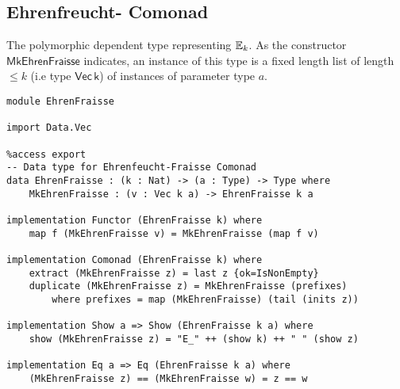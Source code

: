 \subsection{Ehrenfreucht-{\Fraisse} Comonad}
The polymorphic dependent type representing ${\mathbb{E}_{k}}$. As the constructor $\mathsf{MkEhrenFraisse}$ indicates, an instance of this type is a fixed length list of length $\leq k$ (i.e type $\mathsf{Vec} \, \mathsf{k}$) of instances of parameter type $a$.  
\begin{verbatim}
module EhrenFraisse

import Data.Vec 

%access export
-- Data type for Ehrenfeucht-Fraisse Comonad
data EhrenFraisse : (k : Nat) -> (a : Type) -> Type where
    MkEhrenFraisse : (v : Vec k a) -> EhrenFraisse k a

implementation Functor (EhrenFraisse k) where 
    map f (MkEhrenFraisse v) = MkEhrenFraisse (map f v) 

implementation Comonad (EhrenFraisse k) where 
    extract (MkEhrenFraisse z) = last z {ok=IsNonEmpty}
    duplicate (MkEhrenFraisse z) = MkEhrenFraisse (prefixes) 
        where prefixes = map (MkEhrenFraisse) (tail (inits z))

implementation Show a => Show (EhrenFraisse k a) where
    show (MkEhrenFraisse z) = "E_" ++ (show k) ++ " " (show z) 

implementation Eq a => Eq (EhrenFraisse k a) where 
    (MkEhrenFraisse z) == (MkEhrenFraisse w) = z == w
\end{verbatim}
